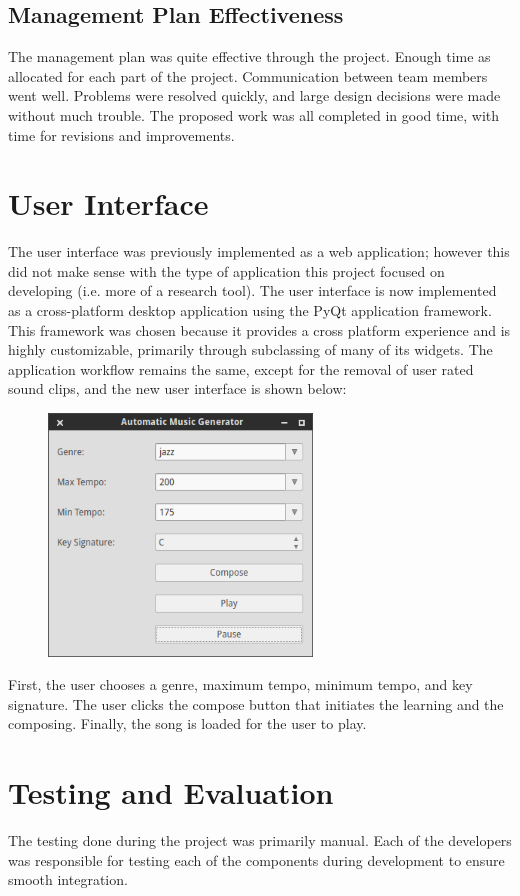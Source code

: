 \documentclass{article}
\begin{document}
\subsection{Management Plan Effectiveness}
The management plan was quite effective through the project. Enough time as allocated for each part of the project. Communication between team members went well. Problems were resolved quickly, and large design decisions were made without much trouble. The proposed work was all completed in good time, with time for revisions and improvements.

\section{User Interface}
The user interface was previously implemented as a web application; however this did not make sense with the type of application this project focused on developing (i.e. more of a research tool). The user interface is now implemented as a cross-platform desktop application using the PyQt application framework. This framework was chosen because it provides a cross platform experience and is highly customizable, primarily through subclassing of many of its widgets. The application workflow remains the same, except for the removal of user rated sound clips, and the new user interface is shown below:

\begin{figure}[H]
\centerline{\includegraphics[width=7cm]{gui.png}}
\end{figure}

First, the user chooses a genre, maximum tempo, minimum tempo, and key signature.  The user clicks the compose button that initiates the learning and the composing.  Finally, the song is loaded for the user to play. 

\section{Testing and Evaluation}
The testing done during the project was primarily manual. Each of the developers was responsible for testing each of the components during development to ensure smooth integration.
\end{document}
